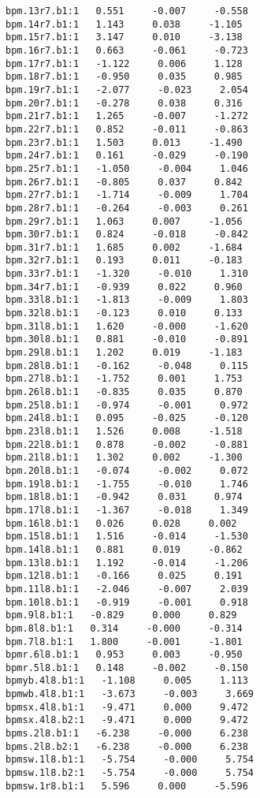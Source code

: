 \begin{verbatim}
bpm.13r7.b1:1   0.551     -0.007     -0.558
bpm.14r7.b1:1   1.143     0.038     -1.105
bpm.15r7.b1:1   3.147     0.010     -3.138
bpm.16r7.b1:1   0.663     -0.061     -0.723
bpm.17r7.b1:1   -1.122     0.006     1.128
bpm.18r7.b1:1   -0.950     0.035     0.985
bpm.19r7.b1:1   -2.077     -0.023     2.054
bpm.20r7.b1:1   -0.278     0.038     0.316
bpm.21r7.b1:1   1.265     -0.007     -1.272
bpm.22r7.b1:1   0.852     -0.011     -0.863
bpm.23r7.b1:1   1.503     0.013     -1.490
bpm.24r7.b1:1   0.161     -0.029     -0.190
bpm.25r7.b1:1   -1.050     -0.004     1.046
bpm.26r7.b1:1   -0.805     0.037     0.842
bpm.27r7.b1:1   -1.714     -0.009     1.704
bpm.28r7.b1:1   -0.264     -0.003     0.261
bpm.29r7.b1:1   1.063     0.007     -1.056
bpm.30r7.b1:1   0.824     -0.018     -0.842
bpm.31r7.b1:1   1.685     0.002     -1.684
bpm.32r7.b1:1   0.193     0.011     -0.183
bpm.33r7.b1:1   -1.320     -0.010     1.310
bpm.34r7.b1:1   -0.939     0.022     0.960
bpm.33l8.b1:1   -1.813     -0.009     1.803
bpm.32l8.b1:1   -0.123     0.010     0.133
bpm.31l8.b1:1   1.620     -0.000     -1.620
bpm.30l8.b1:1   0.881     -0.010     -0.891
bpm.29l8.b1:1   1.202     0.019     -1.183
bpm.28l8.b1:1   -0.162     -0.048     0.115
bpm.27l8.b1:1   -1.752     0.001     1.753
bpm.26l8.b1:1   -0.835     0.035     0.870
bpm.25l8.b1:1   -0.974     -0.001     0.972
bpm.24l8.b1:1   0.095     -0.025     -0.120
bpm.23l8.b1:1   1.526     0.008     -1.518
bpm.22l8.b1:1   0.878     -0.002     -0.881
bpm.21l8.b1:1   1.302     0.002     -1.300
bpm.20l8.b1:1   -0.074     -0.002     0.072
bpm.19l8.b1:1   -1.755     -0.010     1.746
bpm.18l8.b1:1   -0.942     0.031     0.974
bpm.17l8.b1:1   -1.367     -0.018     1.349
bpm.16l8.b1:1   0.026     0.028     0.002
bpm.15l8.b1:1   1.516     -0.014     -1.530
bpm.14l8.b1:1   0.881     0.019     -0.862
bpm.13l8.b1:1   1.192     -0.014     -1.206
bpm.12l8.b1:1   -0.166     0.025     0.191
bpm.11l8.b1:1   -2.046     -0.007     2.039
bpm.10l8.b1:1   -0.919     -0.001     0.918
bpm.9l8.b1:1   -0.829     0.000     0.829
bpm.8l8.b1:1   0.314     -0.000     -0.314
bpm.7l8.b1:1   1.800     -0.001     -1.801
bpmr.6l8.b1:1   0.953     0.003     -0.950
bpmr.5l8.b1:1   0.148     -0.002     -0.150
bpmyb.4l8.b1:1   -1.108     0.005     1.113
bpmwb.4l8.b1:1   -3.673     -0.003     3.669
bpmsx.4l8.b1:1   -9.471     0.000     9.472
bpmsx.4l8.b2:1   -9.471     0.000     9.472
bpms.2l8.b1:1   -6.238     -0.000     6.238
bpms.2l8.b2:1   -6.238     -0.000     6.238
bpmsw.1l8.b1:1   -5.754     -0.000     5.754
bpmsw.1l8.b2:1   -5.754     -0.000     5.754
bpmsw.1r8.b1:1   5.596     0.000     -5.596

\end{verbatim}
